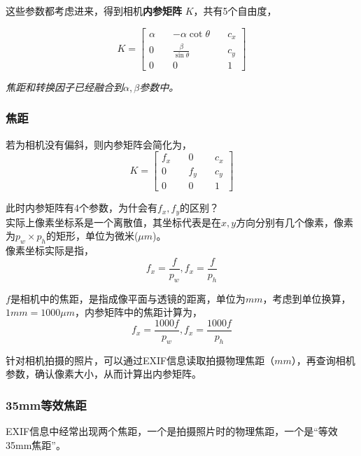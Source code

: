 	这些参数都考虑进来，得到相机\textbf{内参矩阵} $K$，共有5个自由度，

	\begin{equation}
		K = \begin{bmatrix}
			\alpha \quad& -\alpha\cot\theta        \quad& c_x\\
			0      \quad& \frac{\beta}{\sin\theta} \quad& c_y\\
			0      \quad& 0                        \quad& 1
		\end{bmatrix}
	\end{equation}

	\textit{焦距和转换因子已经融合到$\alpha,\beta$参数中。}

\subsubsection*{焦距}

	若为相机没有偏斜，则内参矩阵会简化为，
	\begin{equation}
		K = \begin{bmatrix}
			f_x 	\quad& 0        \quad& c_x\\
			0		\quad& f_y \quad& c_y\\
			0      \quad& 0                        \quad& 1
		\end{bmatrix}
	\end{equation}

	此时内参矩阵有4个参数，为什会有$f_x,f_y$的区别？\\

	实际上像素坐标系是一个离散值，其坐标代表是在$x,y$方向分别有几个像素，像素为$p_w \times p_h$的矩形，单位为微米($\mu m$)。\\

	像素坐标实际是指，
	$$
		f_x = \frac{f}{p_w}, f_x = \frac{f}{p_h}
	$$

	$f$是相机中的焦距，是指成像平面与透镜的距离，单位为$mm$，考虑到单位换算，$1mm = 1000\mu m$，内参矩阵中的焦距计算为，
	$$
		f_x = \frac{1000f}{p_w}, f_x = \frac{1000f}{p_h}
	$$

	针对相机拍摄的照片，可以通过EXIF信息读取拍摄物理焦距（$mm$），再查询相机参数，确认像素大小，从而计算出内参矩阵。

\subsubsection*{35mm等效焦距}

	EXIF信息中经常出现两个焦距，一个是拍摄照片时的物理焦距，一个是“等效35mm焦距”。\\

